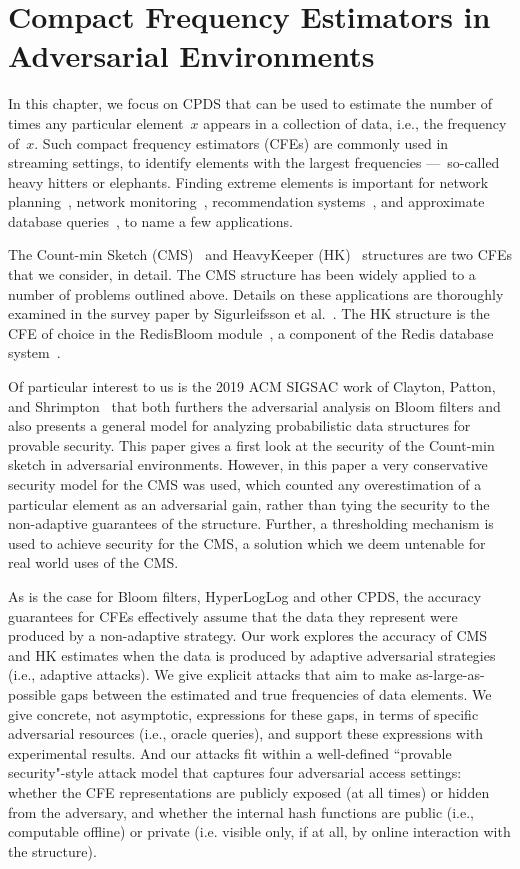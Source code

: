 \chapter{Compact Frequency Estimators in Adversarial Environments}\label{chap:cfe}

In this chapter, we focus on CPDS that can be used to estimate the number of times any particular element~$x$ appears in a collection of data, i.e., the frequency of~$x$. Such compact frequency estimators (CFEs) are commonly used in streaming settings, to identify elements with the largest frequencies ---~so-called heavy hitters or elephants.  Finding extreme elements is important for network planning~\cite{feldmann00}, network monitoring~\cite{lakhina04}, recommendation systems~\cite{melis2015efficient}, and approximate database queries~\cite{redisbloom}, to name a few applications.  

The Count-min Sketch (CMS)~\cite{cormode2005improved} and HeavyKeeper (HK)~\cite{yang2019heavykeeper} structures are two CFEs that we consider, in detail.
The CMS structure has been widely applied to a number of problems outlined above. Details on these applications are thoroughly examined in the survey paper by Sigurleifsson et al.~\cite{sigurleifsson2019overview}. The HK structure is the CFE of choice in the RedisBloom module~\cite{redisbloom}, a component of the Redis database system~\cite{redis}.  

Of particular interest to us is the 2019 ACM SIGSAC work of Clayton, Patton, and Shrimpton~\cite{clayton2019} that both furthers the adversarial analysis on Bloom filters and also presents a general model for analyzing probabilistic data structures for provable security. This paper gives a first look at the security of the Count-min sketch in adversarial environments. However, in this paper a very conservative security model for the CMS was used, which counted any overestimation of a particular element as an adversarial gain, rather than tying the security to the non-adaptive guarantees of the structure. Further, a thresholding mechanism is used to achieve security for the CMS, a solution which we deem untenable for real world uses of the CMS. 

As is the case for Bloom filters, HyperLogLog and other CPDS, the accuracy guarantees for CFEs effectively assume that the data they represent were produced by a non-adaptive strategy.  Our work explores the accuracy of CMS and HK estimates when the data is produced by adaptive adversarial strategies (i.e., adaptive attacks).  We give explicit attacks that aim to make as-large-as-possible gaps between the estimated and true frequencies of data elements.  We give concrete, not asymptotic, expressions for these gaps, in terms of specific adversarial resources (i.e., oracle queries), and support these expressions with experimental results.  And our attacks fit within a well-defined ``provable security"-style attack model that captures four adversarial access settings: whether the CFE representations are publicly exposed (at all times) or hidden from the adversary, and whether the internal hash functions are public (i.e., computable offline) or private (i.e. visible only, if at all, by online interaction with the structure).


